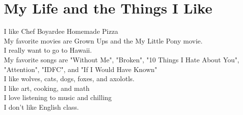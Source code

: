 \documentclass[10pt]{report}
\newcommand{\fbd}{
    \setlength{\fboxsep}{0pt}
    \setlength{\fboxrule}{3pt}
  }
\begin{document}
\section*{My Life and the Things I Like}
\begin{minipage}{0.45\linewidth}
I like Chef Boyardee Homemade Pizza\\
My favorite movies are Grown Ups and the My Little Pony movie.\\
I really want to go to Hawaii.\\
My favorite songs are "Without Me", "Broken", "10 Things I Hate About You",
"Attention", "IDFC", and "If I Would Have Known"\\
I like wolves, cats, dogs, foxes, and axolotls.\\
I like art, cooking, and math\\
I love listening to music and chilling\\
I don't like English class.\\
\end{minipage}
\begin{minipage}{0.45\linewidth}
  \hfill
  {\fbd
  }
\end{minipage} 
\clearpage
\end{document}
